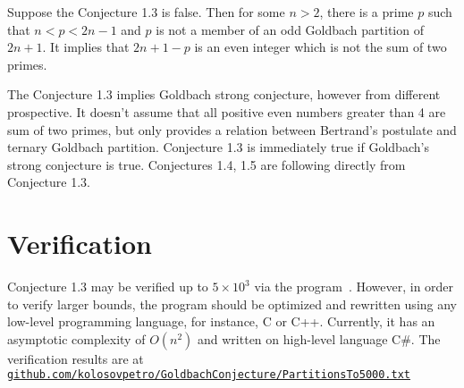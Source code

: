 \documentclass[12pt,letterpaper,oneside,reqno]{amsart}
\begin{document}
    Suppose the Conjecture 1.3 is false.
    Then for some $n > 2$, there is a prime $p$ such that $n<p<2n-1$ and $p$ is not a member
    of an odd Goldbach partition of $2n+1$.
    It implies that $2n+1-p$ is an even integer which is not the sum of two primes.

    The Conjecture 1.3 implies Goldbach strong conjecture, however from different prospective.
    It doesn't assume that all positive even numbers greater than 4 are sum of two primes,
    but only provides a relation between Bertrand's postulate and ternary Goldbach partition.
    Conjecture 1.3 is immediately true if Goldbach's strong conjecture is true.
    Conjectures 1.4, 1.5 are following directly from Conjecture 1.3.


    \section{Verification}\label{sec:verification}
    Conjecture 1.3 may be verified up to $5 \times 10^3$ via the program~\cite{kolosov2021github}.
    However, in order to verify larger bounds, the program should be optimized and rewritten using any
    low-level programming language, for instance, C or C++.
    Currently, it has an asymptotic complexity of $O(n^2)$ and written on high-level language C\#.
    The verification results are at
    \href{https://github.com/kolosovpetro/GoldbachConjecture/blob/master/GoldbachConjecture.BertrandValues.UI/PartitionsTo5000.txt}
    {\texttt{github.com/kolosovpetro/GoldbachConjecture/PartitionsTo5000.txt}}
    
    
\end{document}
